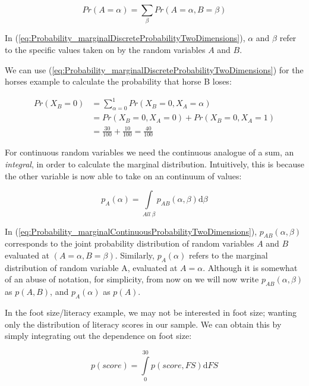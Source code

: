 \documentclass[11pt,fullpage]{book}
\begin{document}
\begin{equation}\label{eq:Probability_marginalDiscreteProbabilityTwoDimensions}
Pr(A=\alpha) = \sum\limits_{\beta} Pr(A=\alpha,B=\beta)
\end{equation}

In (\ref{eq:Probability_marginalDiscreteProbabilityTwoDimensions}), $\alpha$ and $\beta$ refer to the specific values taken on by the random variables $A$ and $B$. 

We can use (\ref{eq:Probability_marginalDiscreteProbabilityTwoDimensions}) for the horses example to calculate the probability that horse B loses:

\begin{equation}
\begin{align}
Pr(X_B=0) &= \sum\limits_{\alpha=0}^{1} Pr(X_B=0,X_A=\alpha)\\
&= Pr(X_B=0,X_A=0) + Pr(X_B=0,X_A=1)\\
&= \frac{30}{100}  + \frac{10}{100}  = \frac{40}{100} 
\end{align}
\end{equation}

For continuous random variables we need the continuous analogue of a sum, an \textit{integral}, in order to calculate the marginal distribution. Intuitively, this is because the other variable is now able to take on an continuum of values:

\begin{equation}\label{eq:Probability_marginalContinuousProbabilityTwoDimensions}
p_A(\alpha) = \int\limits_{All\;\beta} p_{AB}(\alpha,\beta) \mathrm{d}\beta
\end{equation}

In (\ref{eq:Probability_marginalContinuousProbabilityTwoDimensions}), $p_{AB}(\alpha,\beta)$ corresponds to the joint probability distribution of random variables $A$ and $B$ evaluated at $(A=\alpha,B=\beta)$. Similarly, $p_A(\alpha)$ refers to the marginal distribution of random variable A, evaluated at $A=\alpha$. Although it is somewhat of an abuse of notation, for simplicity, from now on we will now write $p_{AB}(\alpha,\beta)$ as $p(A,B)$, and $p_A(\alpha)$ as $p(A)$.

In the foot size/literacy example, we may not be interested in foot size; wanting only the distribution of literacy scores in our sample. We can obtain this by simply integrating out the dependence on foot size:

\begin{equation}\label{eq:Probability_marginalContinuousProbabilityTwoDimensionsFootExample}
p(score) = \int\limits_{0}^{30} p(score,FS) \mathrm{d}FS
\end{equation}
\end{document}
